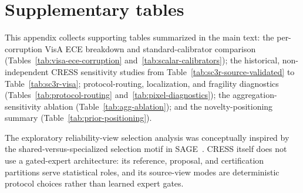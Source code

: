 \appendix
\section{Supplementary tables}\label{app:tables}
This appendix collects supporting tables summarized in the main text: the per-corruption VisA ECE breakdown and standard-calibrator comparison (Tables~\ref{tab:visa-ece-corruption} and~\ref{tab:scalar-calibrators}); the historical, non-independent CRESS sensitivity studies from Table~\ref{tab:sc3r-source-validated} to Table~\ref{tab:sc3r-visa}; protocol-routing, localization, and fragility diagnostics (Tables~\ref{tab:protocol-routing} and~\ref{tab:pixel-diagnostics}); the aggregation-sensitivity ablation (Table~\ref{tab:agg-ablation}); and the novelty-positioning summary (Table~\ref{tab:prior-positioning}).

The exploratory reliability-view selection analysis was conceptually inspired by the shared-versus-specialized selection motif in SAGE~\cite{Thai_2026_CVPR}. CRESS itself does not use a gated-expert architecture: its reference, proposal, and certification partitions serve statistical roles, and its source-view modes are deterministic protocol choices rather than learned expert gates.
\newpage












